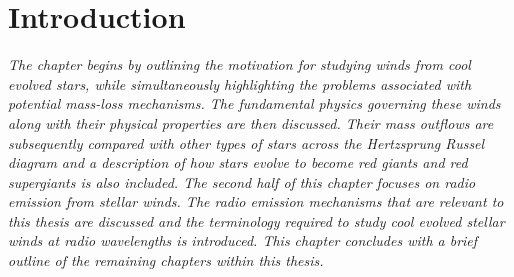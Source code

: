 \chapter{Introduction} \label{chap:1}
\vspace{-1cm}
\textit{The chapter begins by outlining the motivation for studying winds from cool evolved stars, while simultaneously highlighting the problems associated with potential mass-loss mechanisms. The fundamental physics governing these winds along with their physical properties are then discussed. Their mass outflows are subsequently compared with other types of stars across the Hertzsprung Russel diagram and a description of how stars evolve to become red giants and red supergiants is also included. The second half of this chapter focuses on radio emission from stellar winds. The radio emission mechanisms that are relevant to this thesis are discussed and the terminology required to study cool evolved stellar winds at radio wavelengths is introduced. This chapter concludes with a brief outline of the remaining chapters within this thesis.}

\pagebreak

